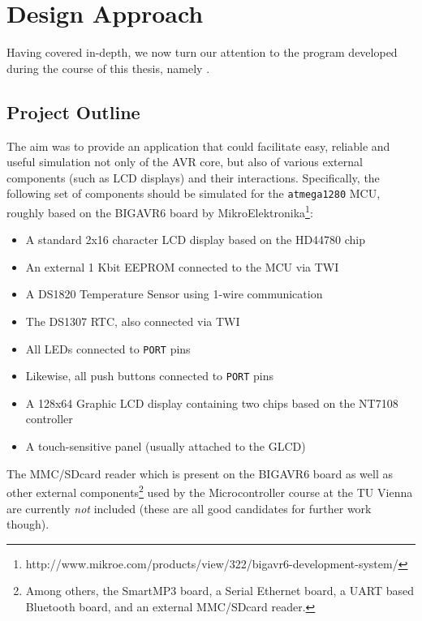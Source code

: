 
\chapter{Design Approach} \label{chapter:designapproach}

Having covered \simavr in-depth, we now turn our attention to the program developed
during the course of this thesis, namely \qsimavr.

\section{Project Outline} \label{section:project_outline}

The aim was to provide an application that could facilitate easy, reliable and
useful simulation not only of the \ac{AVR} core, but also of various external
components (such as \ac{LCD} displays) and their interactions. Specifically,
the following set of components should be simulated for the \verb|atmega1280|
\ac{MCU}, roughly based on the BIGAVR6 board by MikroElektronika\footnote{
%
http://www.mikroe.com/products/view/322/bigavr6-development-system/
%
}:

\begin{itemize}
\item A standard 2x16 character \ac{LCD} display based on the HD44780 chip
\item An external 1 Kbit \ac{EEPROM} connected to the \ac{MCU} via \ac{TWI}
\item A DS1820 Temperature Sensor using 1-wire communication
\item The DS1307 \ac{RTC}, also connected via \ac{TWI}
\item All \acp{LED} connected to \verb|PORT| pins
\item Likewise, all push buttons connected to \verb|PORT| pins
\item A 128x64 Graphic \ac{LCD} display containing two chips based on the NT7108 controller
\item A touch-sensitive panel (usually attached to the \ac{GLCD})
\end{itemize}

The MMC/SDcard reader which is present on the BIGAVR6 board as well as
other external components\footnote{
%
Among others, the SmartMP3 board, a Serial Ethernet board, a \ac{UART} based
Bluetooth board, and an external MMC/SDcard reader.
%
} used by the Microcontroller course at the \ac{TU} Vienna are currently \emph{not} included (these are all good
candidates for further work though).

